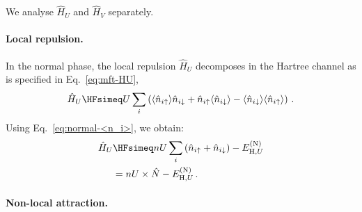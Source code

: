 \begin{tabproof}
	
	We analyse $\hat H_U$ and $\hat H_V$ separately.

	\paragraph{Local repulsion.}
	
	In the normal phase, the local repulsion $\hat H_U$ decomposes in the Hartree channel as is specified in Eq.~\eqref{eq:mft-HU},
	\[
		\hat H_U \HFsimeq
		U \sum_{i} \left(
			\langle 
				\hat n_{i\uparrow}
			\rangle \hat n_{i\downarrow} + \hat n_{i\uparrow} \langle 
				\hat n_{i\downarrow}
			\rangle - \langle 
				\hat n_{i\downarrow}
			\rangle \langle 
				\hat n_{i\uparrow}
				\rangle
		\right) \, .
	\]
	Using Eq.~\eqref{eq:normal-<n_i>}, we obtain:
	\begin{align}
		\hat H_U &\HFsimeq
		nU \sum_i \left(
			 \hat n_{i\uparrow} + \hat n_{i\downarrow}
		\right)
		- E_{\mathrm{H},U}^{(\mathrm{N})}\\
		&= nU \times \hat N - E_{\mathrm{H},U}^{(\mathrm{N})} \, . \label{eq:normal-HU-hartree-approx}
	\end{align}
	
	\paragraph{Non-local attraction.}
	

\end{tabproof}
